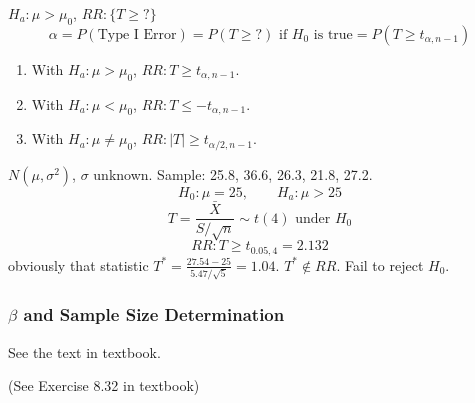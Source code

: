 $H_a: \mu>\mu_0$, $RR:\{T\geq ?\}$
\[\alpha=P(\text{Type I Error})=P(T\geq ?) \text{ if }H_0\text{ is true} =P(T\geq t_{\alpha,n-1}) \]

\begin{enumerate}
\item With $H_a: \mu>\mu_0$, $RR:T\geq t_{\alpha,n-1}$.
\item With $H_a: \mu<\mu_0$, $RR:T\leq -t_{\alpha,n-1}$.
\item With $H_a: \mu\neq\mu_0$, $RR:|T|\geq t_{\alpha/2,n-1}$.
\end{enumerate}

\begin{exmp}
$N(\mu,\sigma^2)$, $\sigma$ unknown. Sample: 25.8, 36.6, 26.3, 21.8, 27.2.
\[H_0:\mu=25, \qquad H_a:\mu>25 \]
\[T=\frac{\bar{X}}{S/\sqrt{n}} \sim t(4) \text{ under } H_0\]
\[RR:T\geq t_{0.05,4}=2.132\]
obviously that statistic $T^*=\frac{27.54-25}{5.47/\sqrt{5}}=1.04$. $T^* \notin RR$. Fail to reject $H_0$.
\end{exmp}

\subsubsection{$\beta$ and Sample Size Determination}
See the text in textbook.
\\

\noindent{}

\begin{exmp}
(See Exercise 8.32 in textbook)
\end{exmp}

